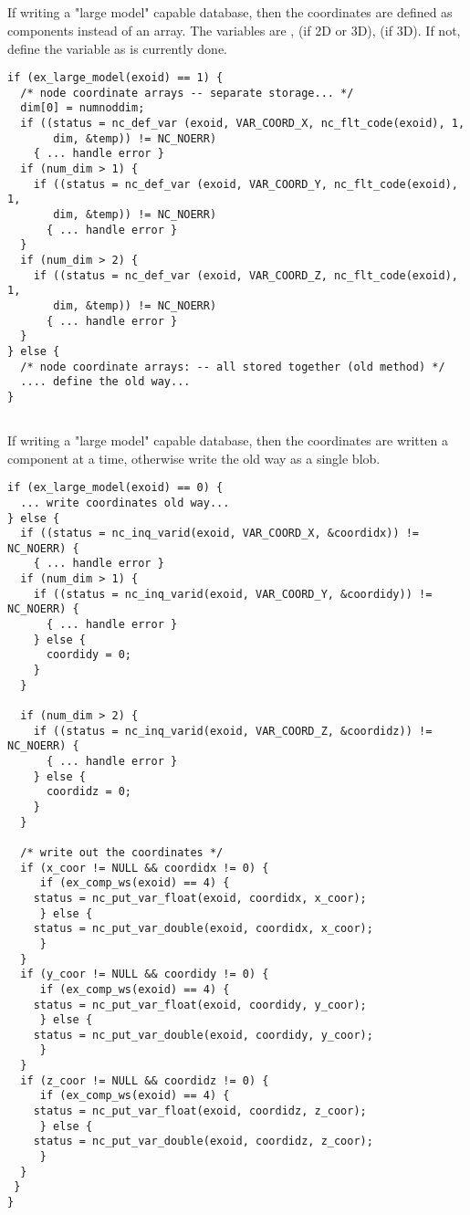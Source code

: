 \subsection{}
If writing a "large model" capable database, then the coordinates are
defined as components instead of an array. The variables are
,  (if 2D or 3D),
 (if 3D). If not, define the 
variable as is currently done.

\begin{lstlisting}
if (ex_large_model(exoid) == 1) {
  /* node coordinate arrays -- separate storage... */
  dim[0] = numnoddim;
  if ((status = nc_def_var (exoid, VAR_COORD_X, nc_flt_code(exoid), 1, 
       dim, &temp)) != NC_NOERR)
    { ... handle error }
  if (num_dim > 1) {
    if ((status = nc_def_var (exoid, VAR_COORD_Y, nc_flt_code(exoid), 1, 
       dim, &temp)) != NC_NOERR)
      { ... handle error }
  }
  if (num_dim > 2) {
    if ((status = nc_def_var (exoid, VAR_COORD_Z, nc_flt_code(exoid), 1, 
       dim, &temp)) != NC_NOERR)
      { ... handle error }
  }
} else {
  /* node coordinate arrays: -- all stored together (old method) */
  .... define the old way...
}
\end{lstlisting}

\subsection{}
If writing a "large model" capable database, then the coordinates are
written a component at a time, otherwise write the old way as a single
blob.
\begin{lstlisting}
if (ex_large_model(exoid) == 0) {
  ... write coordinates old way...
} else {
  if ((status = nc_inq_varid(exoid, VAR_COORD_X, &coordidx)) != NC_NOERR) {
    { ... handle error }
  if (num_dim > 1) {
    if ((status = nc_inq_varid(exoid, VAR_COORD_Y, &coordidy)) != NC_NOERR) {
      { ... handle error }
    } else {
      coordidy = 0;
    }
  }

  if (num_dim > 2) {
    if ((status = nc_inq_varid(exoid, VAR_COORD_Z, &coordidz)) != NC_NOERR) {
      { ... handle error }
    } else {
      coordidz = 0;
    }
  }

  /* write out the coordinates */
  if (x_coor != NULL && coordidx != 0) {
     if (ex_comp_ws(exoid) == 4) {
	status = nc_put_var_float(exoid, coordidx, x_coor);
     } else {
	status = nc_put_var_double(exoid, coordidx, x_coor);
     }
  }
  if (y_coor != NULL && coordidy != 0) {
     if (ex_comp_ws(exoid) == 4) {
	status = nc_put_var_float(exoid, coordidy, y_coor);
     } else {
	status = nc_put_var_double(exoid, coordidy, y_coor);
     }
  }
  if (z_coor != NULL && coordidz != 0) {
     if (ex_comp_ws(exoid) == 4) {
	status = nc_put_var_float(exoid, coordidz, z_coor);
     } else {
	status = nc_put_var_double(exoid, coordidz, z_coor);
     }
  }
 }
}
\end{lstlisting}

